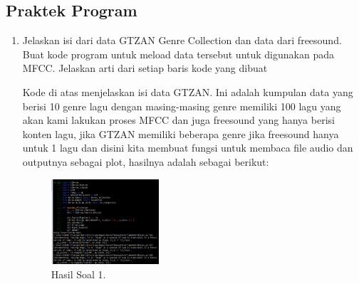 \subsection{Praktek Program}
\begin{enumerate}
	\item  Jelaskan isi dari data GTZAN Genre Collection dan data dari freesound. Buat kode program untuk meload data tersebut untuk digunakan pada MFCC. Jelaskan arti dari setiap baris kode yang dibuat
	\hfill\break
	
	Kode di atas menjelaskan isi data GTZAN. Ini adalah kumpulan data yang berisi 10 genre lagu dengan masing-masing genre memiliki 100 lagu yang akan kami lakukan proses MFCC dan juga freesound yang hanya berisi konten lagu, jika GTZAN memiliki beberapa genre jika freesound hanya untuk 1 lagu dan disini kita membuat fungsi untuk membaca file audio dan outputnya sebagai plot, hasilnya adalah sebagai berikut:
	\begin{figure}[H]
	\centering
		\includegraphics[width=4cm]{figures/1174096/tugas6/hasil1.PNG}
		\caption{Hasil Soal 1.}
	\end{figure}


\end{enumerate}
